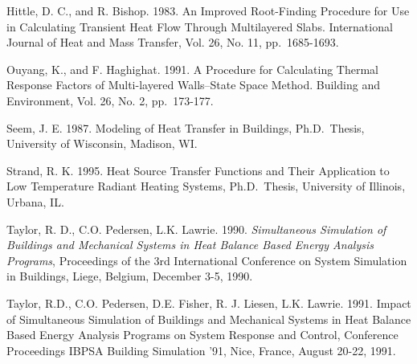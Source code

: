 Hittle, D. C., and R. Bishop. 1983. An Improved Root-Finding Procedure for Use in Calculating Transient Heat Flow Through Multilayered Slabs. International Journal of Heat and Mass Transfer, Vol. 26, No. 11, pp.~1685-1693.

Ouyang, K., and F. Haghighat. 1991. A Procedure for Calculating Thermal Response Factors of Multi-layered Walls--State Space Method. Building and Environment, Vol. 26, No. 2, pp.~173-177.

Seem, J. E. 1987. Modeling of Heat Transfer in Buildings, Ph.D.~Thesis, University of Wisconsin, Madison, WI.

Strand, R. K. 1995. Heat Source Transfer Functions and Their Application to Low Temperature Radiant Heating Systems, Ph.D.~Thesis, University of Illinois, Urbana, IL.

Taylor, R. D., C.O. Pedersen, L.K. Lawrie. 1990. \emph{Simultaneous Simulation of Buildings and Mechanical Systems in Heat Balance Based Energy Analysis Programs}, Proceedings of the 3rd International Conference on System Simulation in Buildings, Liege, Belgium, December 3-5, 1990.

Taylor, R.D., C.O. Pedersen, D.E. Fisher, R. J. Liesen, L.K. Lawrie. 1991. Impact of Simultaneous Simulation of Buildings and Mechanical Systems in Heat Balance Based Energy Analysis Programs on System Response and Control, Conference Proceedings IBPSA Building Simulation '91, Nice, France, August 20-22, 1991.
